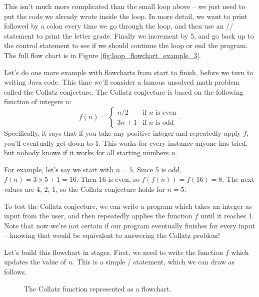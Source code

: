 This isn't much more complicated than the small loop above -- we just need to put the code we already wrote inside the loop. In more detail, we want to print  followed by a colon every time we go through the loop, and then use an // statement to print the letter grade. Finally we increment  by 5, and go back up to the control statement to see if we should continue the loop or end the program. The full flow chart is in Figure \ref{fig:loop_flowchart_example_3}.

Let's do one more example with flowcharts from start to finish, before we turn to writing Java code. This time we'll consider a famous unsolved math problem called the Collatz conjecture. The Collatz conjecture is based on the following function of integers $n$:
\begin{equation*}
    f(n) = \begin{cases} n/2 & \text{if $n$ is even} \\ 3n+1 & \text{if $n$ is odd} \end{cases}.
\end{equation*}
Specifically, it says that if you take any positive integer and repeatedly apply $f$, you'll eventually get down to 1. This works for every instance anyone has tried, but nobody knows if it works for all starting numbers $n$.

For example, let's say we start with $n = 5$. Since 5 is odd, $f(n) = 3\times 5 + 1 = 16$. Then 16 is even, so $f(f(n)) = f(16) = 8$. The next values are 4, 2, 1, so the Collatz conjecture holds for $n = 5$.

To test the Collatz conjecture, we can write a program which takes an integer  as input from the user, and then repeatedly applies the function $f$ until it reaches 1. Note that now we're not certain if our program eventually finishes for every input -- knowing that would be equivalent to answering the Collatz problem!

Let's build this flowchart in stages. First, we need to write the function $f$ which updates the value of $n$. This is a simple / statement, which we can draw as follows. 

\begin{figure}
    \centering
    \caption{The Collatz function represented as a flowchart.}
    \label{fig:collatz_1}
\end{figure}

